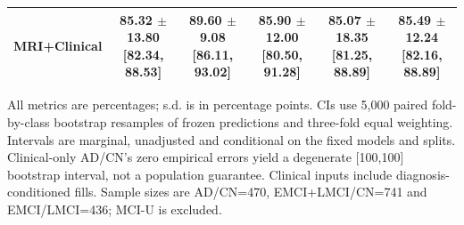 \documentclass{article}
\begin{document}
\begin{landscape}
\begin{longtable}{lccccc}
MRI+Clinical & \shortstack{85.32 $\pm$ 13.80\\{}[82.34, 88.53]} & \shortstack{89.60 $\pm$ 9.08\\{}[86.11, 93.02]} & \shortstack{85.90 $\pm$ 12.00\\{}[80.50, 91.28]} & \shortstack{85.07 $\pm$ 18.35\\{}[81.25, 88.89]} & \shortstack{85.49 $\pm$ 12.24\\{}[82.16, 88.89]} \\
\midrule
\bottomrule
\end{longtable}
\noindent\footnotesize All metrics are percentages; s.d. is in percentage points. CIs use 5,000 paired fold-by-class bootstrap resamples of frozen predictions and three-fold equal weighting. Intervals are marginal, unadjusted and conditional on the fixed models and splits. Clinical-only AD/CN's zero empirical errors yield a degenerate [100,100] bootstrap interval, not a population guarantee. Clinical inputs include diagnosis-conditioned fills. Sample sizes are AD/CN=470, EMCI+LMCI/CN=741 and EMCI/LMCI=436; MCI-U is excluded.
\endgroup
\end{landscape}

\end{document}
